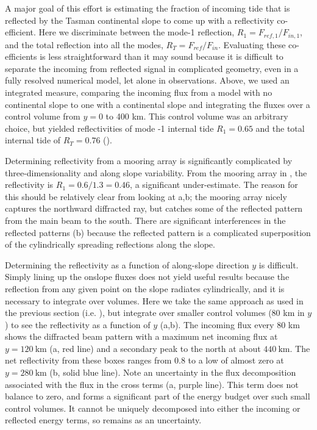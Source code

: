 \documentclass[12pt]{article}
\begin{document}
A major goal of this effort is estimating the fraction of incoming tide that is reflected by the Tasman continental slope to come up with a reflectivity co-efficient. Here we discriminate between the mode-1 reflection, $R_1=F_{ref,1}/F_{in,1}$, and the total reflection into all the modes, $R_T=F_{ref}/F_{in}$. Evaluating these co-efficients is less straightforward than it may sound because it is difficult to separate the incoming from reflected signal in complicated geometry, even in a fully resolved numerical model, let alone in observations.  Above, we used an integrated measure, comparing the incoming flux from a model with no continental slope to one with a continental slope and integrating the fluxes over a control volume from $y=$0 to 400 km.  This control volume was an arbitrary choice, but yielded reflectivities of mode -1 internal tide $R_1=0.65$ and the total internal tide of $R_T=0.76$ (). 

Determining reflectivity from a mooring array is significantly complicated by three-dimensionality and along slope variability.  From the mooring array in , the reflectivity is $R_1=0.6/1.3=0.46$, a significant under-estimate.  The reason for this should be relatively clear from looking at a,b; the mooring array nicely captures the northward diffracted ray, but catches some of the reflected pattern from the main beam to the south. There are significant interferences in the reflected patterns (b) because the reflected pattern is a complicated superposition of the cylindrically spreading reflections along the slope.  

Determining the reflectivity as a function of along-slope direction $y$ is difficult.  Simply lining up the onslope fluxes does not yield useful results because the reflection from any given point on the slope radiates cylindrically, and it is necessary to integrate over volumes.  Here we take the same approach as used in the previous section (i.e. ), but integrate over smaller control volumes (80 km in $y$) to see the reflectivity as a function of $y$ (a,b).  The incoming flux every 80 km shows the diffracted beam pattern with a maximum net incoming flux at $y=120\ \mathrm{km}$ (a, red line) and a secondary peak to the north at about $440\ \mathrm{km}$.  The net reflectivity from these boxes ranges from 0.8 to a low of almost zero at $y=280\ \mathrm{km}$ (b, solid blue line).  Note an uncertainty in the flux decomposition associated with the flux in the cross terms (a, purple line).  This term does not balance to zero, and forms a significant part of the energy budget over such small control volumes.  It cannot be uniquely decomposed into either the incoming or reflected energy terms, so remains as an uncertainty. 
\end{document}
